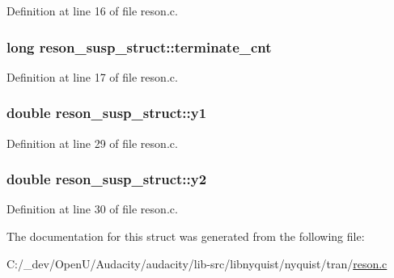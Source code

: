 Definition at line 16 of file reson.\+c.

\subsubsection[{\texorpdfstring{terminate\+\_\+cnt}{terminate_cnt}}]{\setlength{\rightskip}{0pt plus 5cm}long reson\+\_\+susp\+\_\+struct\+::terminate\+\_\+cnt}\hypertarget{structreson__susp__struct_a7dfa213f5843f61144d38dafb9babd99}{}\label{structreson__susp__struct_a7dfa213f5843f61144d38dafb9babd99}


Definition at line 17 of file reson.\+c.

\subsubsection[{\texorpdfstring{y1}{y1}}]{\setlength{\rightskip}{0pt plus 5cm}double reson\+\_\+susp\+\_\+struct\+::y1}\hypertarget{structreson__susp__struct_a67d2d008b9b341dcd80f50cf6038f4d0}{}\label{structreson__susp__struct_a67d2d008b9b341dcd80f50cf6038f4d0}


Definition at line 29 of file reson.\+c.

\subsubsection[{\texorpdfstring{y2}{y2}}]{\setlength{\rightskip}{0pt plus 5cm}double reson\+\_\+susp\+\_\+struct\+::y2}\hypertarget{structreson__susp__struct_ac924288c844adca0e4e3d14d4f5f8ae8}{}\label{structreson__susp__struct_ac924288c844adca0e4e3d14d4f5f8ae8}


Definition at line 30 of file reson.\+c.



The documentation for this struct was generated from the following file\+:\begin{DoxyCompactItemize}
\item 
C\+:/\+\_\+dev/\+Open\+U/\+Audacity/audacity/lib-\/src/libnyquist/nyquist/tran/\hyperlink{reson_8c}{reson.\+c}\end{DoxyCompactItemize}
